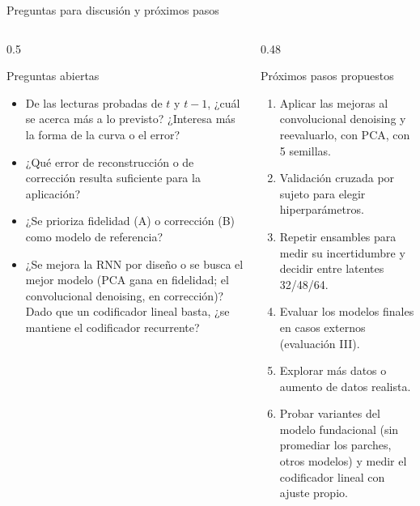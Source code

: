 \documentclass[aspectratio=169,10pt,t]{beamer}
\begin{document}
\begin{frame}{Preguntas para discusión y próximos pasos}
\begin{columns}[T]
\begin{column}{0.5\textwidth}
\begin{block}{Preguntas abiertas}
\begin{itemize}\setlength{\itemsep}{3pt}\small
\item De las lecturas probadas de $t$ y $t-1$, ¿cuál se acerca más a lo previsto? ¿Interesa más la forma de la curva o el error?
\item ¿Qué error de reconstrucción o de corrección resulta suficiente para la aplicación?
\item ¿Se prioriza fidelidad (A) o corrección (B) como modelo de referencia?
\item ¿Se mejora la RNN por diseño o se busca el mejor modelo (PCA gana en fidelidad; el convolucional denoising, en corrección)? Dado que un codificador lineal basta, ¿se mantiene el codificador recurrente?
\end{itemize}
\end{block}
\end{column}
\begin{column}{0.48\textwidth}
\begin{exampleblock}{Próximos pasos propuestos}
\begin{enumerate}\setlength{\itemsep}{3pt}\small
\item Aplicar las mejoras al convolucional denoising y reevaluarlo, con PCA, con 5 semillas.
\item Validación cruzada por sujeto para elegir hiperparámetros.
\item Repetir ensambles para medir su incertidumbre y decidir entre latentes 32/48/64.
\item Evaluar los modelos finales en casos externos (evaluación III).
\item Explorar más datos o aumento de datos realista.
\item Probar variantes del modelo fundacional (sin promediar los parches, otros modelos) y medir el codificador lineal con ajuste propio.
\end{enumerate}
\end{exampleblock}
\end{column}
\end{columns}
\end{frame}
\end{document}
